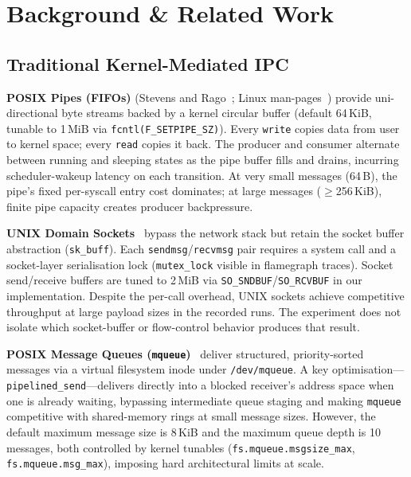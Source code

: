 \documentclass[10pt,conference]{IEEEtran}
\begin{document}
\section{Background \& Related Work}

\subsection{Traditional Kernel-Mediated IPC}

\textbf{POSIX Pipes (FIFOs)} (Stevens and Rago~\cite{stevens2013}; Linux
man-pages~\cite{linux-man}) provide uni-directional byte streams backed by a
kernel circular buffer (default 64\,KiB, tunable to 1\,MiB via
\texttt{fcntl(F\_SETPIPE\_SZ)}).  Every \texttt{write} copies data from user
to kernel space; every \texttt{read} copies it back.  The producer and consumer
alternate between running and sleeping states as the pipe buffer fills and
drains, incurring scheduler-wakeup latency on each transition.  At very small
messages (64\,B), the pipe's fixed per-syscall entry cost dominates; at large
messages ($\geq$256\,KiB), finite pipe capacity creates producer backpressure.

\textbf{UNIX Domain Sockets}~\cite{linux-man} bypass the network stack but retain the socket
buffer abstraction (\texttt{sk\_buff}).  Each \texttt{sendmsg}/\texttt{recvmsg}
pair requires a system call and a socket-layer serialisation lock
(\texttt{mutex\_lock} visible in flamegraph traces).  Socket send/receive
buffers are tuned to 2\,MiB via \texttt{SO\_SNDBUF}/\texttt{SO\_RCVBUF} in
our implementation.  Despite the per-call overhead, UNIX sockets achieve
competitive throughput at large payload sizes in the recorded runs.  The
experiment does not isolate which socket-buffer or flow-control behavior
produces that result.

\textbf{POSIX Message Queues (\texttt{mqueue})}~\cite{linux-man} deliver structured,
priority-sorted messages via a virtual filesystem inode under
\texttt{/dev/mqueue}.  A key optimisation---\texttt{pipelined\_send}---delivers
directly into a blocked receiver's address space when one is already waiting,
bypassing intermediate queue staging and making \texttt{mqueue} competitive
with shared-memory rings at small message sizes.  However, the default maximum
message size is 8\,KiB and the maximum queue depth is 10 messages, both
controlled by kernel tunables (\texttt{fs.mqueue.msgsize\_max},
\texttt{fs.mqueue.msg\_max}), imposing hard architectural limits at scale.
\end{document}
